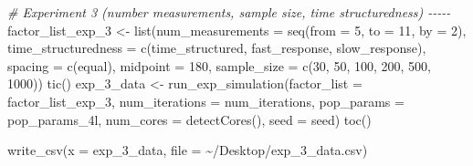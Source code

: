 \documentclass[
12pt, %
twoside,
english]{guelphthesis}
\newenvironment{Shaded}{\begin{snugshade}}{\end{snugshade}}
\newcommand{\AttributeTok}[1]{\textcolor[rgb]{0.77,0.63,0.00}{#1}}
\newcommand{\CommentTok}[1]{\textcolor[rgb]{0.56,0.35,0.01}{\textit{#1}}}
\newcommand{\DecValTok}[1]{\textcolor[rgb]{0.00,0.00,0.81}{#1}}
\newcommand{\FunctionTok}[1]{\textcolor[rgb]{0.00,0.00,0.00}{#1}}
\newcommand{\NormalTok}[1]{#1}
\newcommand{\OtherTok}[1]{\textcolor[rgb]{0.56,0.35,0.01}{#1}}
\newcommand{\StringTok}[1]{\textcolor[rgb]{0.31,0.60,0.02}{#1}}
\begin{document}
\begin{Shaded}
\begin{Highlighting}[numbers=left,,]
\CommentTok{\# Experiment 3 (number measurements, sample size, time structuredness) {-}{-}{-}{-}{-}}
\NormalTok{factor\_list\_exp\_3 }\OtherTok{\textless{}{-}} \FunctionTok{list}\NormalTok{(}\StringTok{\textquotesingle{}num\_measurements\textquotesingle{}} \OtherTok{=} \FunctionTok{seq}\NormalTok{(}\AttributeTok{from =} \DecValTok{5}\NormalTok{, }\AttributeTok{to =} \DecValTok{11}\NormalTok{, }\AttributeTok{by =} \DecValTok{2}\NormalTok{), }
                          \StringTok{\textquotesingle{}time\_structuredness\textquotesingle{}} \OtherTok{=} \FunctionTok{c}\NormalTok{(}\StringTok{\textquotesingle{}time\_structured\textquotesingle{}}\NormalTok{, }\StringTok{\textquotesingle{}fast\_response\textquotesingle{}}\NormalTok{, }\StringTok{\textquotesingle{}slow\_response\textquotesingle{}}\NormalTok{),}
                          \StringTok{\textquotesingle{}spacing\textquotesingle{}} \OtherTok{=} \FunctionTok{c}\NormalTok{(}\StringTok{\textquotesingle{}equal\textquotesingle{}}\NormalTok{), }
                          \StringTok{\textquotesingle{}midpoint\textquotesingle{}} \OtherTok{=} \DecValTok{180}\NormalTok{, }
                          \StringTok{\textquotesingle{}sample\_size\textquotesingle{}} \OtherTok{=} \FunctionTok{c}\NormalTok{(}\DecValTok{30}\NormalTok{, }\DecValTok{50}\NormalTok{, }\DecValTok{100}\NormalTok{, }\DecValTok{200}\NormalTok{, }\DecValTok{500}\NormalTok{, }\DecValTok{1000}\NormalTok{))}
\FunctionTok{tic}\NormalTok{()}
\NormalTok{exp\_3\_data }\OtherTok{\textless{}{-}} \FunctionTok{run\_exp\_simulation}\NormalTok{(}\AttributeTok{factor\_list =}\NormalTok{ factor\_list\_exp\_3, }\AttributeTok{num\_iterations =}\NormalTok{ num\_iterations, }\AttributeTok{pop\_params =}\NormalTok{ pop\_params\_4l, }
                                 \AttributeTok{num\_cores =} \FunctionTok{detectCores}\NormalTok{(), }\AttributeTok{seed =}\NormalTok{ seed)}
\FunctionTok{toc}\NormalTok{()                }

\FunctionTok{write\_csv}\NormalTok{(}\AttributeTok{x =}\NormalTok{ exp\_3\_data, }\AttributeTok{file =} \StringTok{\textquotesingle{}\textasciitilde{}/Desktop/exp\_3\_data.csv\textquotesingle{}}\NormalTok{)}




\end{Highlighting}
\end{Shaded}
\end{document}
